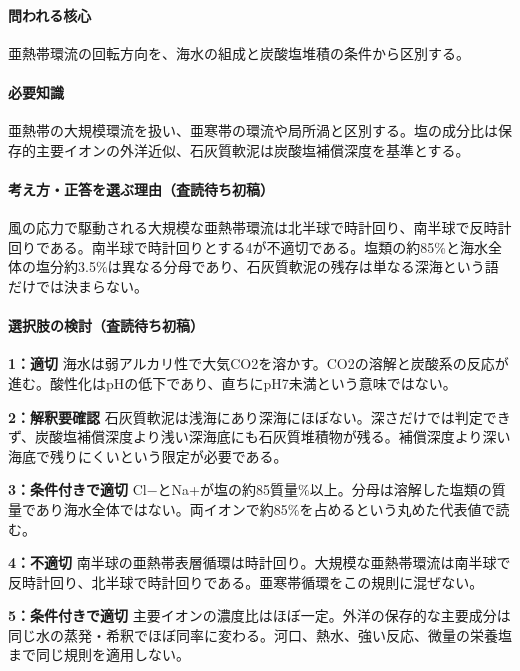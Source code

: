 \paragraph{問われる核心} 亜熱帯環流の回転方向を、海水の組成と炭酸塩堆積の条件から区別する。

\paragraph{必要知識} 亜熱帯の大規模環流を扱い、亜寒帯の環流や局所渦と区別する。塩の成分比は保存的主要イオンの外洋近似、石灰質軟泥は炭酸塩補償深度を基準とする。

\paragraph{考え方・正答を選ぶ理由（査読待ち初稿）} 風の応力で駆動される大規模な亜熱帯環流は北半球で時計回り、南半球で反時計回りである。南半球で時計回りとする4が不適切である。塩類の約85\%と海水全体の塩分約3.5\%は異なる分母であり、石灰質軟泥の残存は単なる深海という語だけでは決まらない。

\paragraph{選択肢の検討（査読待ち初稿）}\mbox{}\par

\noindent\textbf{1：適切} 海水は弱アルカリ性で大気CO2を溶かす。CO2の溶解と炭酸系の反応が進む。酸性化はpHの低下であり、直ちにpH7未満という意味ではない。\par

\noindent\textbf{2：解釈要確認} 石灰質軟泥は浅海にあり深海にほぼない。深さだけでは判定できず、炭酸塩補償深度より浅い深海底にも石灰質堆積物が残る。補償深度より深い海底で残りにくいという限定が必要である。\par

\noindent\textbf{3：条件付きで適切} Cl−とNa+が塩の約85質量\%以上。分母は溶解した塩類の質量であり海水全体ではない。両イオンで約85\%を占めるという丸めた代表値で読む。\par

\noindent\textbf{4：不適切} 南半球の亜熱帯表層循環は時計回り。大規模な亜熱帯環流は南半球で反時計回り、北半球で時計回りである。亜寒帯循環をこの規則に混ぜない。\par

\noindent\textbf{5：条件付きで適切} 主要イオンの濃度比はほぼ一定。外洋の保存的な主要成分は同じ水の蒸発・希釈でほぼ同率に変わる。河口、熱水、強い反応、微量の栄養塩まで同じ規則を適用しない。\par


